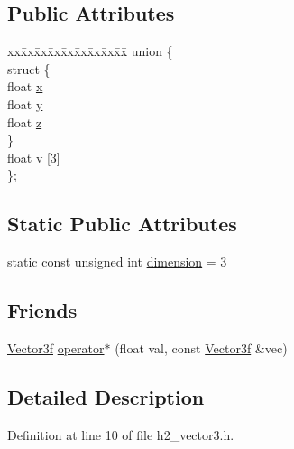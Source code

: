 \subsection*{Public Attributes}
\begin{DoxyCompactItemize}
\item 
\begin{tabbing}
xx\=xx\=xx\=xx\=xx\=xx\=xx\=xx\=xx\=\kill
union \{\\
\>struct \{\\
\>\>float \hyperlink{classh2_1_1_vector3f_ab3cc458a2c088d8ecc160a1aaf3fc81d}{x}\\
\>\>float \hyperlink{classh2_1_1_vector3f_ad8d143b9b36116553c41c76a4de569ff}{y}\\
\>\>float \hyperlink{classh2_1_1_vector3f_acea4aa4f8702625f04fb73cf4b4d7be5}{z}\\
\>\} \\
\>float \hyperlink{classh2_1_1_vector3f_a7a9aebc0837d01f25767a8ccfbb3159c}{v} \mbox{[}3\mbox{]}\\
\}; \\

\end{tabbing}\end{DoxyCompactItemize}
\subsection*{Static Public Attributes}
\begin{DoxyCompactItemize}
\item 
static const unsigned int \hyperlink{classh2_1_1_vector3f_a96a96e43b738e0a0d901789016f16e09}{dimension} = 3
\end{DoxyCompactItemize}
\subsection*{Friends}
\begin{DoxyCompactItemize}
\item 
\hyperlink{classh2_1_1_vector3f}{Vector3f} \hyperlink{classh2_1_1_vector3f_ac06ccc2f48b3616763cc54bb85eb6453}{operator$\ast$} (float val, const \hyperlink{classh2_1_1_vector3f}{Vector3f} \&vec)
\end{DoxyCompactItemize}


\subsection{Detailed Description}


Definition at line 10 of file h2\-\_\-vector3.\-h.



